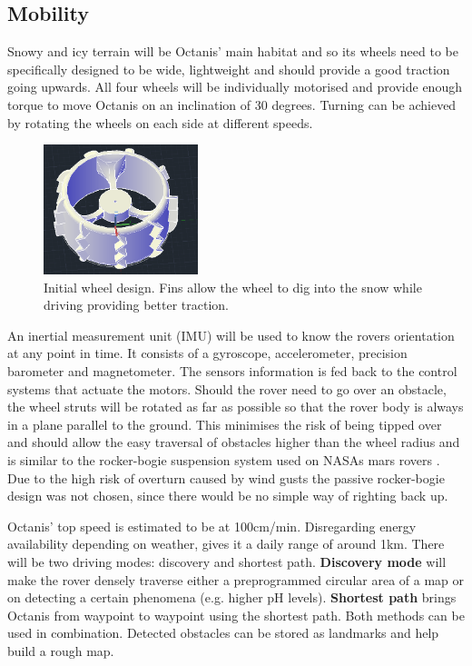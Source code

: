 \documentclass[a4paper,12pt]{article}
\begin{document}
\subsection{Mobility}
Snowy and icy terrain will be Octanis' main habitat and so its wheels need to be specifically designed to be wide, lightweight and should provide a good traction going upwards. 
All four wheels will be individually motorised and provide enough torque to move Octanis on an inclination of 30 degrees. Turning can be achieved by rotating the wheels on each side at different speeds. 

\begin{figure}[h!]
	\centering
    \includegraphics[width=0.4\textwidth]{wheel}
    \caption{Initial wheel design. Fins allow the wheel to dig into the snow while driving providing better traction.}
\end{figure}


An inertial measurement unit (IMU) will be used to know the rovers orientation at any point in time. It consists of a gyroscope, accelerometer, precision barometer and magnetometer. The sensors information is fed back to the control systems that actuate the motors. Should the rover need to go over an obstacle, the wheel struts will be rotated as far as possible so that the rover body is always in a plane parallel to the ground. This minimises the risk of being tipped over and should allow the easy traversal of obstacles higher than the wheel radius and is similar to the rocker-bogie suspension system used on NASAs mars rovers \cite{rockerbogie}. Due to the high risk of overturn caused by wind gusts the passive rocker-bogie design was not chosen, since there would be no simple way of righting back up.

Octanis' top speed is estimated to be at 100cm/min. Disregarding energy availability depending on weather, gives it a daily range of around 1km. There will be two driving modes: discovery and shortest path. \textbf{Discovery mode} will make the rover densely traverse either a preprogrammed circular area of a map or on detecting a certain phenomena (e.g. higher pH levels). \textbf{Shortest path} brings Octanis from waypoint to waypoint using the shortest path. Both methods can be used in combination. Detected obstacles can be stored as landmarks and help build a rough map.
\end{document}
